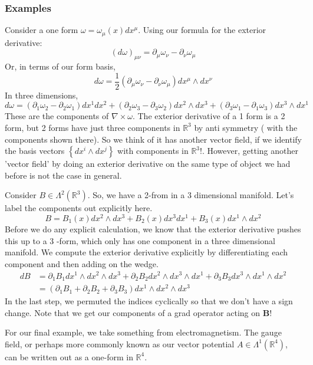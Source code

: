 \documentclass[11pt, a4paper]{article}   	%
\theoremstyle{slplain}
\begin{document}
\subsubsection{Examples} 
Consider a one form $ \omega = \omega_\mu( x) dx^\mu $. Using our formula for the exterior derivative: 
\[
( d \omega)_{ \mu \nu } = \partial _\mu \omega_\nu - \partial  _\nu \omega_\mu 
\] Or, in terms of our form basis, 
\[
d \omega = \frac{1}{2 } ( \partial _\mu \omega_\nu - \partial _\nu \omega _\mu ) dx^\mu \wedge  dx ^ \nu 
\] In three dimensions, 
\[
d \omega = ( \partial_1 \omega_2 - \partial_2 \omega_1 ) dx^ 1 dx ^ 2 + ( \partial_2 \omega_3 -\partial_3 \omega_2 ) dx^ 2 \wedge  dx^ 3 + ( \partial_3 \omega_1 - \partial_1 \omega_3  ) dx^ 3 \wedge  dx^ 1 
\] These are the components of $ \nabla \times \omega $. 
The exterior derivative of a 1 form is a 2 form, but 2 forms have just three components in $ \mathbb{ R} ^3$ by anti symmetry ( with the components shown there). So we think of it has another vector field, if we identify the basis vectors $ \left\{  dx^ i \wedge  dx^ j  \right\} $ with components in $ \mathbb{R}^ 3 $!. 
However, getting another 'vector field' by doing an exterior derivative on the 
same type of object we had before is not the case in general.

Consider  $ B \in \Lambda^ 2 ( \mathbb{ R} ^ 3 ) $. So, we have
a 2-from in a 3 dimensional manifold. Let's label the components out 
explicitly here. 
\[
 B = B_1 ( x) dx^ 2 \wedge  dx^ 3 + B_2 ( x) dx^ 3 dx^ 1 + B_3 ( x) dx^ 1 \wedge  dx^ 2 
\] Before we do any explicit calculation, 
we know that the exterior derivative pushes this up to a 3 -form, which only has one component
in a three dimensional manifold. We compute the exterior derivative 
explicitly by differentiating each component
and then adding on the wedge.
\begin{align*}
	d B &=  \partial _ 1 B_ 1 dx ^1 \wedge  dx ^ 2 \wedge  dx^ 3  + \partial _ 2 B_2 dx^ 2 \wedge  dx^ 3 \wedge  dx^ 1 + \partial  _ 3 B _ 3 dx^ 3 \wedge  dx^ 1 \wedge  dx^ 2  \\
	    &=   \left( \partial  _ 1 B _ 1 + \partial  _ 2 B _ 2 + \partial  _ 3 B _ 3 
	     \right) dx^ 1 \wedge  dx^ 2 \wedge  dx^ 3 
\end{align*} 
In the last step, we permuted the indices cyclically 
so that we don't have a sign change. 
Note that we get our components of a grad
operator acting on $ \mathbf { B } $! 

For our final example, we take something from
electromagnetism. The gauge field, or perhaps more commonly 
known as our vector potential $ A \in \Lambda ^ 1 ( \mathbb{ R} ^ 4 ) $, 
can be written out as a one-form in $ \mathbb{ R } ^ 4 $. 
\end{document}
